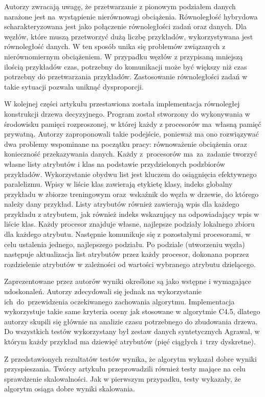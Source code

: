 \documentclass[12pt]{article}
\begin{document}
Autorzy zwracają uwagę, że przetwarzanie z pionowym podziałem danych narażone jest na~wystąpienie nierównowagi obciążenia.
Równoległość hybrydowa scharakteryzowana jest jako połączenie równoległości zadań oraz danych. Dla węzłów, które muszą przetworzyć dużą liczbę przykładów, wykorzystywana
jest równoległość danych. W ten sposób unika się problemów związanych z nierównomiernym obciążeniem. W przypadku węzłów z przypisaną mniejszą ilością przykładów
czas, potrzebny do komunikacji może być większy niż czas potrzebny do przetwarzania przykładów. Zastosowanie równoległości zadań w takie sytuacji pozwala uniknąć dysproporcji.

W kolejnej części artykułu przestawiona została implementacja równoległej konstrukcji drzewa decyzyjnego. Program został stworzony do wykonywania w środowisku pamięci
rozproszonej, w której każdy z procesorów ma~własną pamięć prywatną. Autorzy zaproponowali takie podejście, ponieważ ma ono rozwiązywać dwa problemy wspominane na
początku pracy: równoważenie obciążenia oraz konieczność przekazywania danych. Każdy z~procesorów ma~za~zadanie tworzyć własne listy atrybutów i klas na podstawie
przydzielonych podzbiorów przykładów. Wykorzystanie obydwu list jest kluczem do osiągnięcia efektywnego paralelizmu. Wpisy w liście klas zawierają etykietę klasy, indeks
globalny przykładu w zbiorze treningowym oraz~wskaźnik do węzła w drzewie, do którego należy dany przykład. Listy atrybutów również zawierają wpis dla każdego przykładu
z atrybutem, jak również indeks wskazujący na odpowiadający wpis w liście klas. Każdy procesor znajduje własne, najlepsze podziały lokalnego zbioru dla każdego atrybutu.
Następnie komunikuje się z pozostałymi procesorami, w celu ustalenia jednego, najlepszego podziału. Po podziale (utworzeniu węzła) następuje aktualizacja list atrybutów
przez każdy procesor, dokonana poprzez rozdzielenie atrybutów w zależności od wartości wybranego atrybutu dzielącego.

Zaprezentowane przez autorów wyniki określone są jako wstępne i wymagające udoskonaleń. Autorzy zdecydowali się jednak na wykorzystanie ich~do~przewidzenia oczekiwanego
zachowania algorytmu. Implementacja wykorzystuje takie same kryteria oceny jak stosowane w algorytmie C4.5, dlatego autorzy skupili się głównie na analizie czasu potrzebnego do
zbudowania drzewa. Do wszystkich testów wykorzystany był zestaw danych syntetycznych Agrawal, w którym każdy przykład ma dziewięć atrybutów (pięć ciągłych i~trzy dyskretne).

Z przedstawionych rezultatów testów wynika, że algorytm wykazał dobre wyniki przyspieszania. Twórcy artykułu przeprowadzili również testy mające na celu sprawdzenie skalowalności.
Jak w pierwszym przypadku, testy wykazały, że algorytm osiąga dobre wyniki skalowania.
\end{document}

